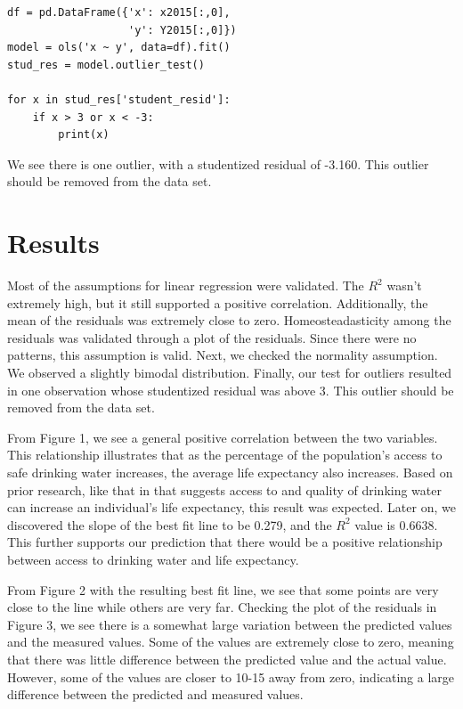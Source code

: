 \documentclass[12pt]{article}
\begin{document}
\begin{adjustwidth}{0.5in}{0.25in}
\begin{lstlisting}
df = pd.DataFrame({'x': x2015[:,0],
                   'y': Y2015[:,0]})
model = ols('x ~ y', data=df).fit()
stud_res = model.outlier_test()

for x in stud_res['student_resid']:
    if x > 3 or x < -3:
        print(x)
\end{lstlisting}
\end{adjustwidth}

We see there is one outlier, with a studentized residual of -3.160. This outlier should be removed from the data set.

\section{Results}

Most of the assumptions for linear regression were validated. The $R^2$ wasn't extremely high, but it still supported a positive correlation. Additionally, the mean of the residuals was extremely close to zero. Homeosteadasticity among the residuals was validated through a plot of the residuals. Since there were no patterns, this assumption is valid. Next, we checked the normality assumption. We observed a slightly bimodal distribution. Finally, our test for outliers resulted in one observation whose studentized residual was above 3. This outlier should be removed from the data set.

\vspace{15pt}

From Figure 1, we see a general positive correlation between the two variables. This relationship illustrates that as the percentage of the population's access to safe drinking water increases, the average life expectancy also increases. Based on prior research, like that in \citet{angelakis2021quality} that suggests access to and quality of drinking water can increase an individual's life expectancy, this result was expected. Later on, we discovered the slope of the best fit line to be 0.279, and the $R^2$ value is 0.6638. This further supports our prediction that there would be a positive relationship between access to drinking water and life expectancy.

\vspace{15pt}

From Figure 2 with the resulting best fit line, we see that some points are very close to the line while others are very far. Checking the plot of the residuals in Figure 3, we see there is a somewhat large variation between the predicted values and the measured values. Some of the values are extremely close to zero, meaning that there was little difference between the predicted value and the actual value. However, some of the values are closer to 10-15 away from zero, indicating a large difference between the predicted and measured values.
\end{document}
